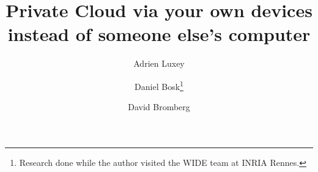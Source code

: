 \title{%
  Private Cloud via your own devices instead of someone else's computer
}
\author[1]{Adrien Luxey}
\author[2]{Daniel Bosk\thanks{%
    Research done while the author visited the WIDE team at INRIA Rennes.
  }}
\author[1]{David Bromberg}


\mode*

\begin{abstract}
  
\end{abstract}







\begin{frame}[allowframebreaks]
  \printbibliography{}
\end{frame}
